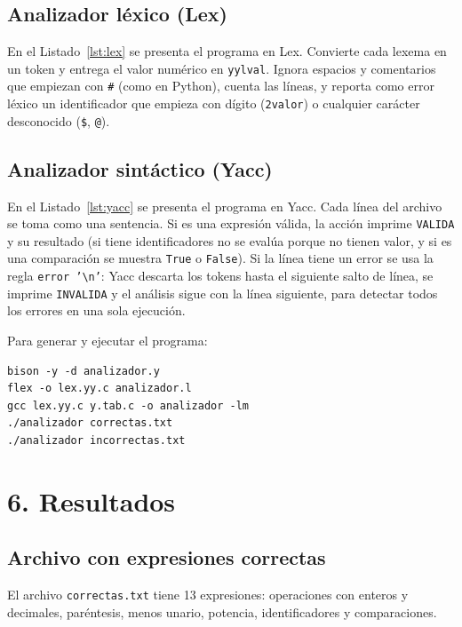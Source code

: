 \documentclass{article}
\begin{document}
    \subsection{Analizador léxico (Lex)}
    En el Listado~\ref{lst:lex} se presenta el programa en Lex. Convierte cada lexema en un token y entrega el valor numérico en \texttt{yylval}. Ignora espacios y comentarios que empiezan con \texttt{\#} (como en Python), cuenta las líneas, y reporta como error léxico un identificador que empieza con dígito (\texttt{2valor}) o cualquier carácter desconocido (\texttt{\$}, \texttt{@}).

    

    \subsection{Analizador sintáctico (Yacc)}
    En el Listado~\ref{lst:yacc} se presenta el programa en Yacc. Cada línea del archivo se toma como una sentencia. Si es una expresión válida, la acción imprime \texttt{VALIDA} y su resultado (si tiene identificadores no se evalúa porque no tienen valor, y si es una comparación se muestra \texttt{True} o \texttt{False}). Si la línea tiene un error se usa la regla \texttt{error '\textbackslash n'}: Yacc descarta los tokens hasta el siguiente salto de línea, se imprime \texttt{INVALIDA} y el análisis sigue con la línea siguiente, para detectar todos los errores en una sola ejecución.

    

    Para generar y ejecutar el programa:
    \begin{lstlisting}[numbers=none]
bison -y -d analizador.y
flex -o lex.yy.c analizador.l
gcc lex.yy.c y.tab.c -o analizador -lm
./analizador correctas.txt
./analizador incorrectas.txt
    \end{lstlisting}
    \newpage

\section{6. Resultados}
    \subsection{Archivo con expresiones correctas}
    El archivo \texttt{correctas.txt} tiene 13 expresiones: operaciones con enteros y decimales, paréntesis, menos unario, potencia, identificadores y comparaciones.
    
\end{document}
